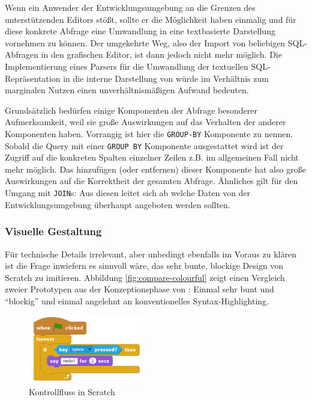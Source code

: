 Wenn ein Anwender der Entwicklungsumgebung an die Grenzen des unterstützenden Editors stößt, sollte er die Möglichkeit haben einmalig und für diese konkrete Abfrage eine Umwandlung in eine textbasierte Darstellung vornehmen zu können. Der umgekehrte Weg, also der Import von beliebigen SQL-Abfragen in den grafischen Editor, ist dann jedoch nicht mehr möglich. Die Implementierung eines Parsers für die Umwandlung der textuellen SQL-Repräsentation in die interne Darstellung von \idename würde im Verhältnis zum marginalen Nutzen einen unverhältnismäßigen Aufwand bedeuten.

Grundsätzlich bedürfen einige Komponenten der Abfrage besonderer Aufmerksamkeit, weil sie große Auswirkungen auf das Verhalten der anderer Komponenten haben. Vorrangig ist hier die \texttt{GROUP-BY} Komponente zu nennen. Sobald die Query mit einer \texttt{GROUP BY} Komponente ausgestattet wird ist der Zugriff auf die konkreten Spalten einzelner Zeilen z.B. im allgemeinen Fall nicht mehr möglich. Das hinzufügen (oder entfernen) dieser Komponente hat also große Auswirkungen auf die Korrektheit der gesamten Abfrage. Ähnliches gilt für den Umgang mit \texttt{JOIN}s: Aus diesen leitet sich ab welche Daten von der Entwicklungsumgebung überhaupt angeboten werden sollten.

\subsubsection{Visuelle Gestaltung}

Für technische Details irrelevant, aber unbedingt ebenfalls im Voraus zu klären ist die Frage inwiefern es sinnvoll wäre, das sehr bunte, blockige Design von Scratch zu imitieren. Abbildung \ref{fig:compare-colourful} zeigt einen Vergleich zweier Prototypen aus der Konzeptionsphase von \idename: Einmal sehr bunt und ``blockig'' und einmal angelehnt an konventionelles Syntax-Highlighting.


\begin{figure}
  \includegraphics[width=0.45\textwidth]{images/scratch-control-flow}
  \caption{Kontrollfluss in Scratch}
  \label{fig:screen-scratch-control-flow}
\end{figure}

